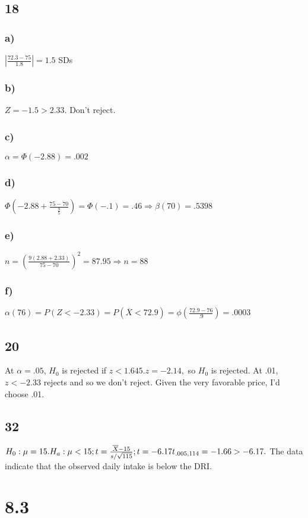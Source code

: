 \documentclass{article}
\begin{document}
	\subsection*{18}
		\subsubsection*{a)}
			$\left | \frac{72.3-75}{1.8} \right | = 1.5 $ SDs
		\subsubsection*{b)}
			$Z = -1.5 > 2.33$. Don't reject.  
		\subsubsection*{c)}
			$\alpha = \Phi (-2.88) = .002$
		\subsubsection*{d)}
			$\Phi \left ( -2.88 + \frac{75-70}{\frac{9}{5}} \right ) = \Phi(-.1) = .46 \Rightarrow \beta(70) = .5398$
		\subsubsection*{e)}
			$n = \left( \frac{9(2.88+2.33)}{75-70} \right )^2 = 87.95 \Rightarrow n = 88$
		\subsubsection*{f)}
			$\alpha(76) = P(Z < -2.33) = P(\overline{X} < 72.9) = \phi \left ( \frac{72.9 - 76}{.9} \right ) = .0003$
	\subsection*{20}
		At $\alpha = .05$, $H_0$ is rejected if $z< 1.645. z = -2.14,$ so $H_0$ is rejected. At .01, $z < -2.33$ rejects and so we don't reject. Given the very favorable price, I'd choose .01.
	\subsection*{32}
		$H_0 : \mu = 15. H_a: \mu < 15; t = \frac{\overline{X} - 15}{s / \sqrt{115}}; t = -6.17\\
		t_{.005,114} =-1.66 > -6.17.\\$
		The data indicate that the observed daily intake is below the DRI. 
\section*{8.3}
\end{document}
